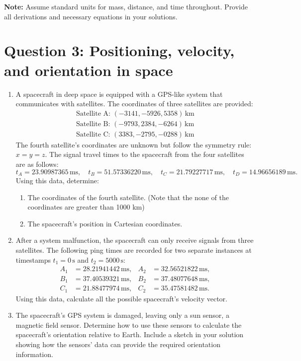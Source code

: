\documentclass[a4paper, 12pt]{exam}
\begin{document}
\textbf{Note:} Assume standard units for mass, distance, and time throughout. Provide all derivations and necessary equations in your solutions.
	
\pagebreak
	

\section*{Question 3: Positioning, velocity, and orientation in space}

\begin{enumerate}[label = (\alph*)]
	\item A spacecraft in deep space is equipped with a GPS-like system that communicates with satellites. The coordinates of three satellites are provided:
	\begin{align*}
		\text{Satellite A: } (-3141, -5926, 5358) \, \text{km} \\
		\text{Satellite B: } (-9793, 2384, -6264) \, \text{km} \\
		\text{Satellite C: } (3383, -2795, -0288) \, \text{km}
	\end{align*}
	The fourth satellite's coordinates are unknown but follow the symmetry rule: \(x = y = z\). The signal travel times to the spacecraft from the four satellites are as follows:
	\begin{equation}
	t_A = 23.90987365 \, \text{ms}, \quad
	t_B = 51.57336220 \, \text{ms}, \quad
	t_C = 21.79227717 \, \text{ms}, \quad
	t_D = 14.96656189 \, \text{ms}.
	\end{equation}
	Using this data, determine:
	\begin{enumerate}[label = (\roman*)]
		\item The coordinates of the fourth satellite. (Note that the none of the coordinates are greater than 1000 km)
		\item The spacecraft's position in Cartesian coordinates.
	\end{enumerate}
	
	\item After a system malfunction, the spacecraft can only receive signals from three satellites. The following ping times are recorded for two separate instances at timestamps \(t_1 = 0 \, \text{s}\) and \(t_2 = 5000 \, \text{s}\):
	\begin{align*}
		A_1 &= 28.21941442 \, \text{ms}, & A_2 &= 32.56521822 \, \text{ms}, \\
		B_1 &= 37.40539321 \, \text{ms}, & B_2 &= 37.48077648 \, \text{ms}, \\
		C_1 &= 21.88477974 \, \text{ms}, & C_2 &= 35.47581482 \, \text{ms}.
	\end{align*}
	Using this data, calculate all the possible spacecraft's velocity vector.
	
	\item The spacecraft's GPS system is damaged, leaving only a sun sensor, a magnetic field sensor. Determine how to use these sensors to calculate the spacecraft's orientation relative to Earth. Include a sketch in your solution showing how the sensors' data can provide the required orientation information.
\end{enumerate}
\end{document}
